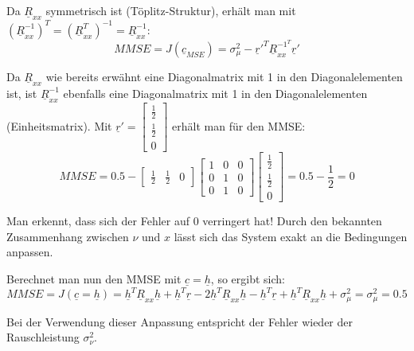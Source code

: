 Da $\underline{R}_{xx}$ symmetrisch ist (Töplitz-Struktur), erhält man mit $(\underline{R}_{xx}^{-1})^T = (\underline{R}_{xx}^T)^{-1} = \underline{R}_{xx}^{-1}$:
\begin{equation}
 MMSE = J(\underline{c}_{MSE}) = \sigma_\mu^2 - \underline{r}'^T \underline{R}_{xx}^{-1^T} \underline{r}'
\end{equation}

Da $\underline{R}_{xx}$ wie bereits erwähnt eine Diagonalmatrix mit 1 in den Diagonalelementen ist, ist $\underline{R}_{xx}^{-1}$ ebenfalls eine Diagonalmatrix mit 1 in den Diagonalelementen (Einheitsmatrix). Mit $\underline{r}' = \begin{bmatrix} \frac{1}{2} \\ \frac{1}{2} \\ 0 \end{bmatrix}$ erhält man für den MMSE:
\begin{equation}
 MMSE = 0.5 - \begin{bmatrix} \frac{1}{2} &  \frac{1}{2} & 0 \end{bmatrix} \begin{bmatrix} 1 & 0 & 0 \\ 0 & 1 & 0 \\ 0 & 1 & 0 \end{bmatrix} \begin{bmatrix} \frac{1}{2} \\  \frac{1}{2} \\ 0 \end{bmatrix} = 0.5 - \frac{1}{2} = 0
\end{equation}

Man erkennt, dass sich der Fehler auf 0 verringert hat! Durch den bekannten Zusammenhang zwischen $\nu$ und $x$ lässt sich das System exakt an die Bedingungen anpassen.

Berechnet man nun den MMSE mit $\underline{c} = \underline{h}$, so ergibt sich:
\begin{equation}
 MMSE = J(\underline{c} = \underline{h}) = \underline{h}^T \underline{R}_{xx} \underline{h} + \underline{h}^T \underline{r} - 2 \underline{h}^T \underline{R}_{xx} \underline{h} - \underline{h}^T \underline{r} + \underline{h}^T \underline{R}_{xx} \underline{h} + \sigma_\mu^2 = \sigma_\mu^2 = 0.5
\end{equation}

Bei der Verwendung dieser Anpassung entspricht der Fehler wieder der Rauschleistung $\sigma_\nu^2$.
